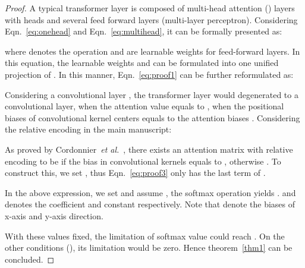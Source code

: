 \documentclass[journal]{IEEEtran}
\def\etal{{\em et al.}}
\newtheorem{proof}{Proof}[section]
\begin{document}
\begin{proof}
A typical transformer layer  is composed of multi-head attention () layers with  heads and several feed forward layers (multi-layer perceptron). Considering Eqn.~\eqref{eq:onehead} and Eqn.~\eqref{eq:multihead}, it can be formally presented as:

where  denotes the  operation and  are learnable weights for feed-forward layers. In this equation, the learnable weights  and  can be formulated into one unified projection of .
In this manner, Eqn.~\eqref{eq:proof1} can be further reformulated as:

Considering a convolutional layer , the transformer layer would degenerated to a convolutional layer, when the attention value  equals to , when the positional biases  of convolutional kernel centers equals to the attention biases . Considering the relative encoding in the main manuscript:


As proved by Cordonnier~\etal~\cite{cordonnier2020relationship}, there exists an attention matrix  with relative encoding to be  if the bias in convolutional kernels equals to , otherwise . To construct this, we set , thus Eqn.~\eqref{eq:proof3} only has the last term of .

In the above expression, we set  and assume , the softmax operation  yields .  and  denotes the coefficient and constant respectively.
Note that  denote the biases of x-axis and y-axis direction.

With these values fixed, the limitation of softmax value  could reach . On the other conditions (), its limitation would be zero. Hence theorem~\ref{thm1} can be concluded.
\end{proof}


\balance
\end{document}
